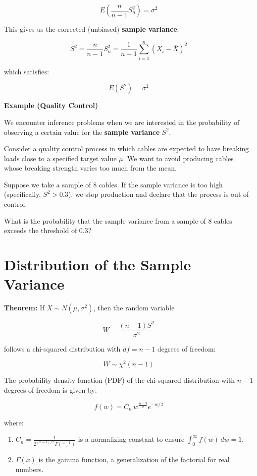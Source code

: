 \documentclass[
]{book}
\providecommand{\tightlist}{%
  \setlength{\itemsep}{0pt}\setlength{\parskip}{0pt}}
\begin{document}
\[
E\left( \frac{n}{n - 1} S_n^2 \right) = \sigma^2
\]

This gives us the corrected (unbiased) \textbf{sample variance}:

\[
S^2 = \frac{n}{n - 1} S_n^2 = \frac{1}{n - 1} \sum_{i=1}^n (X_i - \bar{X})^2
\]

which satisfies:

\[
E(S^2) = \sigma^2
\]

\textbf{Example (Quality Control)}

We encounter inference problems when we are interested in the probability of observing a certain value for the \textbf{sample variance} \(S^2\).

Consider a quality control process in which cables are expected to have breaking loads close to a specified target value \(\mu\). We want to avoid producing cables whose breaking strength varies too much from the mean.

Suppose we take a sample of 8 cables. If the sample variance is too high (specifically, \(S^2 > 0.3\)), we stop production and declare that the process is out of control.

What is the probability that the sample variance from a sample of 8 cables exceeds the threshold of \(0.3\)?

\hypertarget{distribution-of-the-sample-variance}{%
\section{Distribution of the Sample Variance}\label{distribution-of-the-sample-variance}}

\textbf{Theorem:} If \(X \sim N(\mu, \sigma^2)\), then the random variable

\[
W = \frac{(n - 1) S^2}{\sigma^2}
\]

follows a chi-squared distribution with \(df = n - 1\) degrees of freedom:

\[
W \sim \chi^2(n - 1)
\]

The probability density function (PDF) of the chi-squared distribution with \(n - 1\) degrees of freedom is given by:

\[
f(w) = C_n \, w^{\frac{n - 3}{2}} e^{-w/2}
\]

where:

\begin{enumerate}
\def\labelenumi{\arabic{enumi}.}
\tightlist
\item
  \(C_n = \frac{1}{2^{(n-1)/2} \, \Gamma\left(\frac{n - 1}{2}\right)}\) is a normalizing constant to ensure \(\int_0^\infty f(w) \, dw = 1\),
\item
  \(\Gamma(x)\) is the gamma function, a generalization of the factorial for real numbers.
\end{enumerate}
\end{document}
